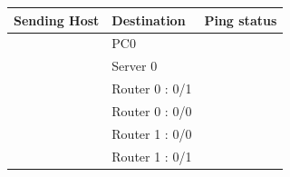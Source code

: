 \documentclass[a4paper,11pt]{article}
\begin{document}
\begin{enumerate}
          \begin{table}[H]
              \centering
              \begin{tabular}{| m{9em}| m{12em}| m{9em} |}
                  \hline
                  {\cellcolor[rgb]{0.333,0.686,1}}\textbf{Sending Host}                & \textbf{Destination} & \textbf{Ping status}                                                  \\
                  \hline
                  {\cellcolor[rgb]{0.333,0.686,1}}                                     & PC0                  & {\cellcolor[rgb]{1,0.141,0.059}}                                      \\
                  \hhline{|>{\arrayrulecolor[rgb]{0.333,0.686,1}}->{\arrayrulecolor{black}}->{\arrayrulecolor[rgb]{1,0.141,0.059}}->{\arrayrulecolor{black}}|}
                  {\cellcolor[rgb]{0.333,0.686,1}}                                     & Server 0             & {\cellcolor[rgb]{1,0.141,0.059}}                                      \\
                  \hhline{|>{\arrayrulecolor[rgb]{0.333,0.686,1}}->{\arrayrulecolor{black}}->{\arrayrulecolor[rgb]{1,0.141,0.059}}->{\arrayrulecolor{black}}|}
                  {\cellcolor[rgb]{0.333,0.686,1}}                                     & Router 0 : 0/1       & {\cellcolor[rgb]{1,0.141,0.059}}                                      \\
                  \hhline{|>{\arrayrulecolor[rgb]{0.333,0.686,1}}->{\arrayrulecolor{black}}->{\arrayrulecolor[rgb]{1,0.141,0.059}}->{\arrayrulecolor{black}}|}
                  {\cellcolor[rgb]{0.333,0.686,1}}                                     & Router 0 : 0/0       & {\cellcolor[rgb]{1,0.141,0.059}}                                      \\
                  \hhline{|>{\arrayrulecolor[rgb]{0.333,0.686,1}}->{\arrayrulecolor{black}}->{\arrayrulecolor[rgb]{1,0.141,0.059}}->{\arrayrulecolor{black}}|}
                  {\cellcolor[rgb]{0.333,0.686,1}}                                     & Router 1 : 0/0       & {\cellcolor[rgb]{1,0.141,0.059}}                                      \\
                  \hhline{|>{\arrayrulecolor[rgb]{0.333,0.686,1}}->{\arrayrulecolor{black}}->{\arrayrulecolor[rgb]{1,0.141,0.059}}->{\arrayrulecolor{black}}|}
                  {\cellcolor[rgb]{0.333,0.686,1}}                                     & Router 1 : 0/1       & {\cellcolor[rgb]{1,0.141,0.059}}                                      \\

\end{tabular}
\end{table}
\end{enumerate}
\end{document}
